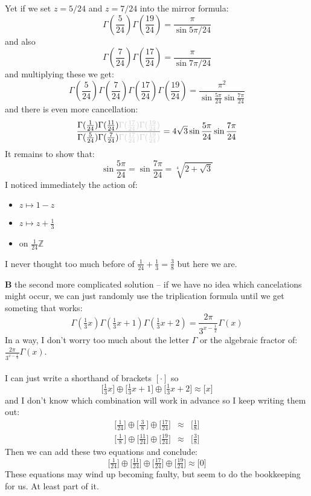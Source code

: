\documentclass[12pt]{article}
\begin{document}
\noindent Yet if we set $z = 5/24$ and $z = 7/24$ into the mirror formula:
$$ \Gamma(\frac{5}{24})
\Gamma(\frac{19}{24})
= \frac{\pi}{\sin 5\pi / 24}
$$
and also 
$$ \Gamma(\frac{7}{24})
\Gamma(\frac{17}{24})
= \frac{\pi}{\sin 7\pi / 24}
$$
and multiplying these we get:
$$ 
\Gamma(\frac{ 5}{24})
\Gamma(\frac{7}{24})
\Gamma(\frac{17}{24})
\Gamma(\frac{19}{24})
= 
\frac{\pi^2}{\sin \frac{5\pi}{24}
\sin \frac{7\pi}{24}}
 $$
 and there is even more cancellation:
 $$
 \frac{\Gamma(\frac{ 1}{24})
\Gamma(\frac{11}{24}) 
{\color{black!20!white}{\Gamma(\frac{17}{24})
\Gamma(\frac{19}{24})}} }
{\Gamma(\frac{ 5}{24})
\Gamma(\frac{7}{24})
{\color{black!20!white}{\Gamma(\frac{17}{24})
\Gamma(\frac{19}{24})}}} 
 = 4 \sqrt{3} \sin \frac{5\pi}{24}
\sin \frac{7\pi}{24} $$
It remains to show that:
$$ \sin \frac{5 \pi}{24} = 
\sin \frac{7 \pi}{24}
= \sqrt[4]{2 + \sqrt{3}} $$
I noticed immediately the action of:
\begin{itemize}
\item $z \mapsto 1 - z$
\item $z \mapsto z + \frac{1}{3}$
\item on $\frac{1}{24}\mathbb{Z}$
\end{itemize}
I never thought too much before of $\boxed{\frac{1}{24} + \frac{1}{3} = \frac{3}{8}}$ but here we are.

\newpage

\noindent \textbf{B} the second more complicated solution -- if we have no idea which cancelations might occur, we can just randomly use the triplication formula until we get someting that works:
$$ \Gamma(\tfrac{1}{3}x)
 \Gamma(\tfrac{1}{3}x+1)
  \Gamma(\tfrac{1}{3}x+2)
  = \frac{2\pi}{3^{x - \frac{1}{2}}}\Gamma(x) $$
In a way, I don't worry too much about the letter $\Gamma$ or the algebraic fractor of: $\frac{2\pi}{3^{x - \frac{1}{2}}}\Gamma(x) $.  \\ \\ 
I can just write a shorthand of brackets $[ \cdot ] $ so
$$ 
\Big[\tfrac{1}{3}x \Big]\oplus 
\Big[\tfrac{1}{3}x +1 \Big]\oplus 
\Big[ \tfrac{1}{3}x + 2 \Big]
\approx \big[ x \big]
 $$
 and I don't know which combination will work in advance so I keep writing them out:
 \begin{eqnarray}
\Big[\tfrac{1}{24} \Big]\oplus 
\Big[\tfrac{3}{\;8\;}\Big]\oplus 
\Big[\tfrac{17}{24} \Big]
&\approx& \Big[ \tfrac{1}{8} \Big] \\
\Big[\tfrac{1}{\;8\;} \Big]\oplus 
\Big[\tfrac{11}{24}\Big]\oplus 
\Big[\tfrac{19}{24} \Big]
&\approx& \Big[ \tfrac{3}{8} \Big] 
 \end{eqnarray}
 Then we can add these two equations and conclude:
$$
\Big[\tfrac{1}{24} \Big]\oplus 
\Big[\tfrac{11}{24}\Big]\oplus 
\Big[\tfrac{17}{24} \Big] \oplus
\Big[\tfrac{19}{24} \Big]
 \approx  \big[0\big]$$
These equations may wind up becoming faulty, but seem to do the bookkeeping for us.  At least part of it.
\newpage
\end{document}
